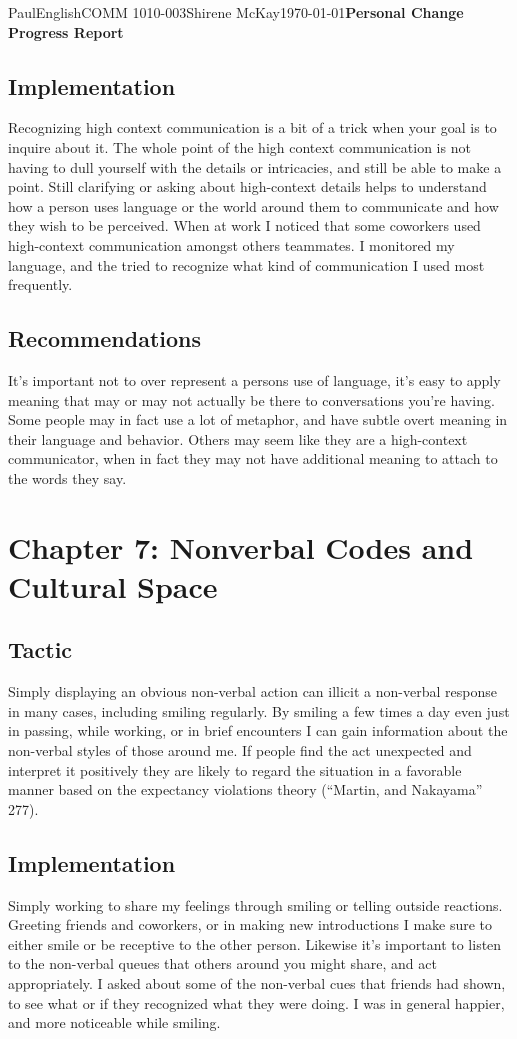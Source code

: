 \documentclass[12pt,letterpaper]{article}
\begin{document}
\begin{mla}{Paul}{English}{COMM 1010-003}{Shirene
    McKay}{\today}{\textbf{Personal Change Progress Report}}
\subsection{Implementation}
Recognizing high context communication is a bit of a trick when your
goal is to inquire about it. The whole point of the high context
communication is not having to dull yourself with the details or
intricacies, and still be able to make a point. Still clarifying or
asking about high-context details helps to understand how a person
uses language or the world around them to communicate and how they
wish to be perceived. When at work I noticed that some coworkers used high-context communication amongst others teammates. I monitored my language, and the tried to recognize what kind of communication I used most frequently.

\subsection{Recommendations}
It's important not to over represent a persons use of language, it's
easy to apply meaning that may or may not actually be there to
conversations you're having. Some people may in fact use a lot of
metaphor, and have subtle overt meaning in their language and
behavior. Others may seem like they are a high-context communicator,
when in fact they may not have additional meaning to attach to the
words they say.

\section{Chapter 7: Nonverbal Codes and Cultural Space}
\subsection{Tactic}

Simply displaying an obvious non-verbal action can illicit a
non-verbal response in many cases, including smiling regularly. By
smiling a few times a day even just in passing, while 
working, or in brief encounters I can gain information about the
non-verbal styles of those around me. If people find the act unexpected and interpret it positively they are likely to regard the situation in a favorable manner based on the expectancy violations theory (``Martin, and Nakayama'' 277).

\subsection{Implementation}
Simply working to share my feelings through smiling or telling outside
reactions. Greeting friends and coworkers, or in making new
introductions I make sure to either smile or be receptive to the other
person. Likewise it's important to listen to the non-verbal queues
that others around you might share, and act appropriately. I asked about some of the non-verbal cues that friends had shown, to see what or if they recognized what they were doing. I was in general happier, and more noticeable while smiling.


\end{mla}
\end{document}
